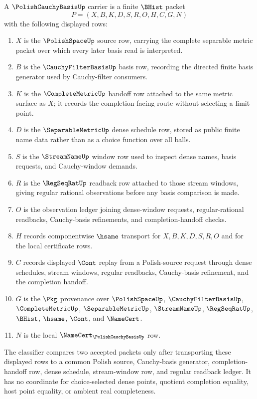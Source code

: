 \begin{definition}
\label{def:polish-cauchy-basis-carrier}
A $\PolishCauchyBasisUp$ carrier is a finite $\BHist$ packet
$$
P=(X,B,K,D,S,R,O,H,C,G,N)
$$
with the following displayed rows:
\begin{enumerate}
\item $X$ is the $\PolishSpaceUp$ source row, carrying the complete separable
metric packet over which every later basis read is interpreted.
\item $B$ is the $\CauchyFilterBasisUp$ basis row, recording the directed
finite basis generator used by Cauchy-filter consumers.
\item $K$ is the $\CompleteMetricUp$ handoff row attached to the same metric
surface as $X$; it records the completion-facing route without selecting a
limit point.
\item $D$ is the $\SeparableMetricUp$ dense schedule row, stored as public
finite name data rather than as a choice function over all balls.
\item $S$ is the $\StreamNameUp$ window row used to inspect dense names,
basis requests, and Cauchy-window demands.
\item $R$ is the $\RegSeqRatUp$ readback row attached to those stream
windows, giving regular rational observations before any basis comparison is
made.
\item $O$ is the observation ledger joining dense-window requests,
regular-rational readbacks, Cauchy-basis refinements, and completion-handoff
checks.
\item $H$ records componentwise $\hsame$ transport for $X,B,K,D,S,R,O$ and
for the local certificate rows.
\item $C$ records displayed $\Cont$ replay from a Polish-source request
through dense schedules, stream windows, regular readbacks, Cauchy-basis
refinement, and the completion handoff.
\item $G$ is the $\Pkg$ provenance over $\PolishSpaceUp$,
$\CauchyFilterBasisUp$, $\CompleteMetricUp$, $\SeparableMetricUp$,
$\StreamNameUp$, $\RegSeqRatUp$, $\BHist$, $\hsame$, $\Cont$, and
$\NameCert$.
\item $N$ is the local $\NameCert_{\PolishCauchyBasisUp}$ row.
\end{enumerate}
The classifier compares two accepted packets only after transporting these
displayed rows to a common Polish source, Cauchy-basis generator,
completion-handoff row, dense schedule, stream-window row, and regular
readback ledger. It has no coordinate for choice-selected dense points,
quotient completion equality, host point equality, or ambient real
completeness.
\end{definition}

